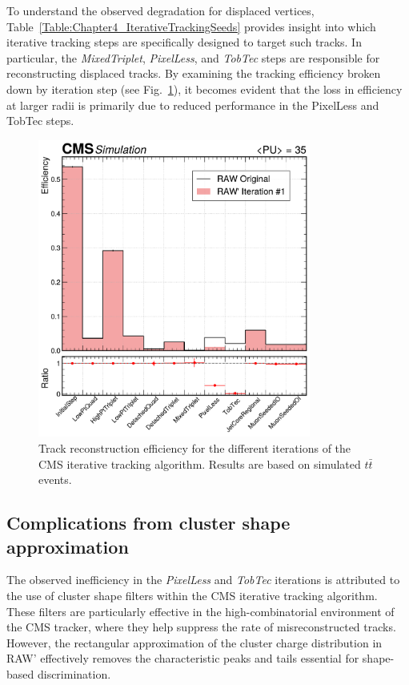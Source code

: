 To understand the observed degradation for displaced vertices, Table~\ref{Table:Chapter4_IterativeTrackingSeeds} provides insight into which iterative tracking steps are specifically designed to target such tracks. In particular, the \textit{MixedTriplet}, \textit{PixelLess}, and \textit{TobTec} steps are responsible for reconstructing displaced tracks. By examining the tracking efficiency broken down by iteration step (see Fig.~\ref{Figure:Chapter5_TrackingPerformance_bystep}), it becomes evident that the loss in efficiency at larger radii is primarily due to reduced performance in the PixelLess and TobTec steps.

\begin{figure}[h]
\centering
\includegraphics[width=0.8\textwidth]{Figures/Chapter5/efficiency_with_ratio.pdf}
\caption[Track reconstruction efficiency for the different iterations of the CMS iterative tracking algorithm.]{Track reconstruction efficiency for the different iterations of the \ac{CMS} iterative tracking algorithm. Results are based on simulated $t\bar{t}$ events.}
\label{Figure:Chapter5_TrackingPerformance_bystep}
\end{figure}

\subsection{Complications from cluster shape approximation}

The observed inefficiency in the \textit{PixelLess} and \textit{TobTec} iterations is attributed to the use of cluster shape filters within the \ac{CMS} iterative tracking algorithm. These filters are particularly effective in the high-combinatorial environment of the \ac{CMS} tracker, where they help suppress the rate of misreconstructed tracks. However, the rectangular approximation of the cluster charge distribution in RAW' effectively removes the characteristic peaks and tails essential for shape-based discrimination.

